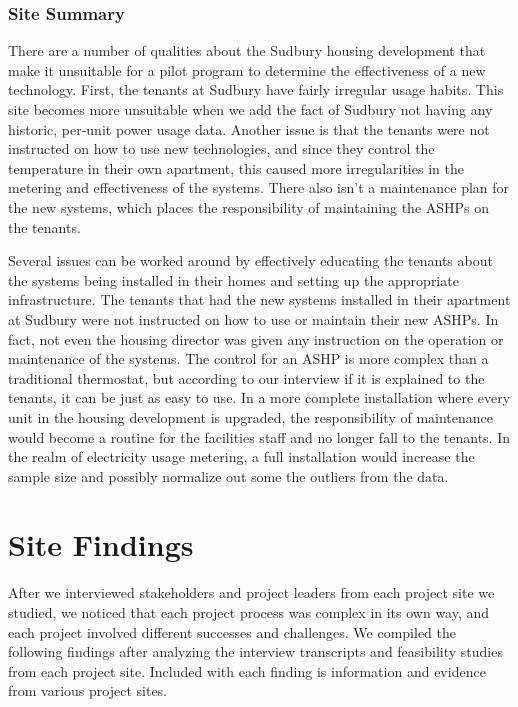 \subsubsection{Site Summary}
\par There are a number of qualities about the Sudbury housing development that make it unsuitable for a pilot program to determine the effectiveness of a new technology. First, the tenants at Sudbury have fairly irregular usage habits. This site becomes more unsuitable when we add the fact of Sudbury not having any historic, per-unit power usage data. Another issue is that the tenants were not instructed on how to use new technologies, and since they control the temperature in their own apartment, this caused more irregularities in the metering and effectiveness of the systems. There also isn’t a maintenance plan for the new systems, which places the responsibility of maintaining the ASHPs on the tenants.
\par Several issues can be worked around by effectively educating the tenants about the systems being installed in their homes and setting up the appropriate infrastructure. The tenants that had the new systems installed in their apartment at Sudbury were not instructed on how to use or maintain their new ASHPs. In fact, not even the housing director was given any instruction on the operation or maintenance of the systems. The control for an ASHP is more complex than a traditional thermostat, but according to our interview if it is explained to the tenants, it can be just as easy to use. In a more complete installation where every unit in the housing development is upgraded, the responsibility of maintenance would become a routine for the facilities staff and no longer fall to the tenants. In the realm of electricity usage metering, a full installation would increase the sample size and possibly normalize out some the outliers from the data. 

\section{Site Findings}
\par After we interviewed stakeholders and project leaders from each project site we studied, we noticed that each project process was complex in its own way, and each project involved different successes and challenges. We compiled the following findings after analyzing the interview transcripts and feasibility studies from each project site. Included with each finding is information and evidence from various project sites.\\

